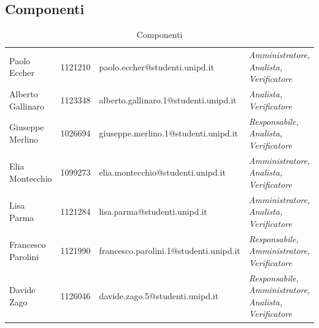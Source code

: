 	\subsection{Componenti}	
	\begin{table}[H]
		\centering
		\begin{tabular}{|C{2cm}|C{2.3cm}|C{7cm}|C{3cm}|}
			\hline
			 &  & & \\
			\hline			
			Paolo Eccher & 1121210 & paolo.eccher@studenti.unipd.it &  \textit{Amministratore, Analista, Verificatore} \\
			\hline
			Alberto Gallinaro & 1123348 & alberto.gallinaro.1@studenti.unipd.it  &  \textit{Analista, Verificatore} \\
			\hline
			Giuseppe Merlino & 1026694 & giuseppe.merlino.1@studenti.unipd.it & \textit{Responsabile, Analista, Verificatore} \\
			\hline
			Elia Montecchio & 1099273 & elia.montecchio@studenti.unipd.it & \textit{Amministratore, Analista, Verificatore} \\
			\hline
			Lisa Parma & 1121284 & lisa.parma@studenti.unipd.it & \textit{Amministratore, Analista, Verificatore} \\
			\hline
			Francesco Parolini & 1121990 & francesco.parolini.1@studenti.unipd.it  & \textit{Responsabile, Amministratore, Verificatore} \\
			\hline
			Davide Zago & 1126046 & davide.zago.5@studenti.unipd.it & \textit{Responsabile, Amministratore, Analista, Verificatore }\\
			\hline
		\end{tabular}
		\caption{Componenti}
	\end{table}
	
	